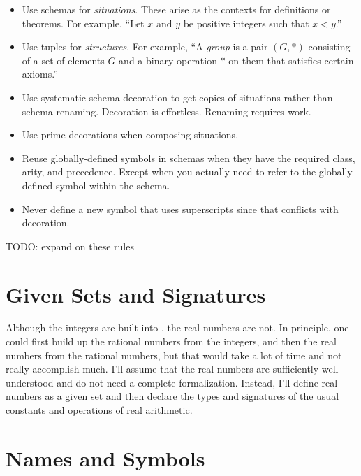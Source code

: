\documentclass{amsart}
\begin{document}
\begin{itemize}
	\item Use schemas for \textit{situations}. These arise as the contexts for definitions or theorems.
	For example, ``Let $x$ and $y$ be positive integers such that $x < y$.''
	\item Use tuples for \textit{structures}. For example, ``A \textit{group} is a pair $(G, *)$ 
	consisting of a set of elements $G$
	and a binary operation $*$ on them that satisfies certain axioms.''
	\item Use systematic schema decoration to get copies of situations rather than schema renaming.
	Decoration is effortless. Renaming requires work.
	\item Use prime decorations when composing situations.
	\item Reuse globally-defined symbols in schemas when they have the required class, arity, and precedence.
	Except when you actually need to refer to the globally-defined symbol within the schema.
	\item Never define a new symbol that uses superscripts since that conflicts with decoration.
\end{itemize}

TODO: expand on these rules

\section{Given Sets and Signatures}

Although the integers are built into \ZN, the real numbers are not.
In principle, one could first build up the rational numbers from the integers,
and then the real numbers from the rational numbers, but that would take a lot of time and not really
accomplish much.
I'll assume that the real numbers are sufficiently well-understood and do not need a complete formalization.
Instead, I'll define real numbers as a given set and then declare the types and signatures of the usual constants and operations of real arithmetic.

\section{Names and Symbols}
\end{document}
